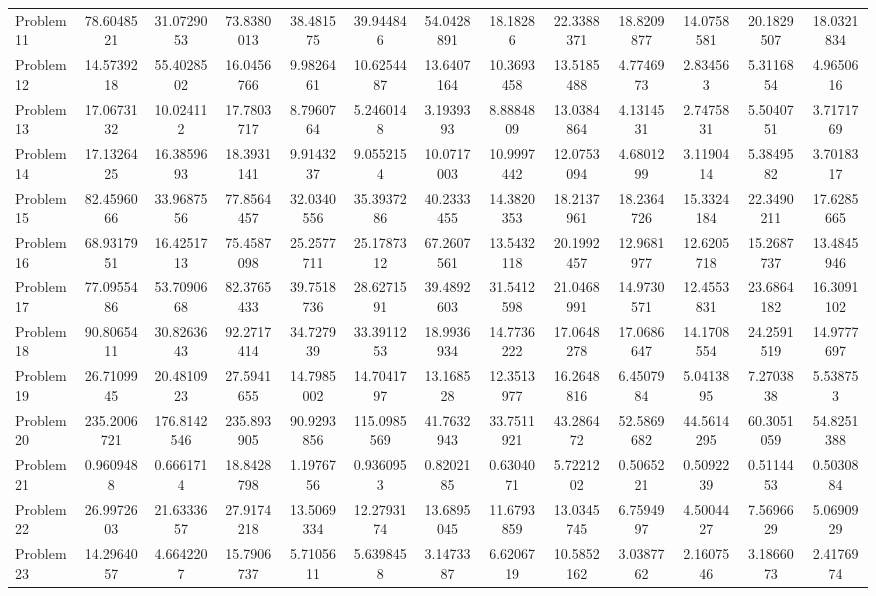 \documentclass[amsmath, amssymb, aps]{revtex4-2}
\begin{document}
\begin{table}[H]
{\begin{tabular}{lcccccccccccc}
Problem 11 & 78.6048521 & 31.0729053 & 73.8380013 & 38.481575 & 39.944846 & 54.0428891 & 18.18286 & 22.3388371 & 18.8209877 & 14.0758581 & 20.1829507 & 18.0321834 \\
Problem 12 & 14.5739218 & 55.4028502 & 16.0456766 & 9.9826461 & 10.6254487 & 13.6407164 & 10.3693458 & 13.5185488 & 4.7746973 & 2.834563 & 5.3116854 & 4.9650616 \\
Problem 13 & 17.0673132 & 10.024112 & 17.7803717 & 8.7960764 & 5.2460148 & 3.1939393 & 8.8884809 & 13.0384864 & 4.1314531 & 2.7475831 & 5.5040751 & 3.7171769 \\
Problem 14 & 17.1326425 & 16.3859693 & 18.3931141 & 9.9143237 & 9.0552154 & 10.0717003 & 10.9997442 & 12.0753094 & 4.6801299 & 3.1190414 & 5.3849582 & 3.7018317 \\
Problem 15 & 82.4596066 & 33.9687556 & 77.8564457 & 32.0340556 & 35.3937286 & 40.2333455 & 14.3820353 & 18.2137961 & 18.2364726 & 15.3324184 & 22.3490211 & 17.6285665 \\
Problem 16 & 68.9317951 & 16.4251713 & 75.4587098 & 25.2577711 & 25.1787312 & 67.2607561 & 13.5432118 & 20.1992457 & 12.9681977 & 12.6205718 & 15.2687737 & 13.4845946 \\
Problem 17 & 77.0955486 & 53.7090668 & 82.3765433 & 39.7518736 & 28.6271591 & 39.4892603 & 31.5412598 & 21.0468991 & 14.9730571 & 12.4553831 & 23.6864182 & 16.3091102 \\
Problem 18 & 90.8065411 & 30.8263643 & 92.2717414 & 34.727939 & 33.3911253 & 18.9936934 & 14.7736222 & 17.0648278 & 17.0686647 & 14.1708554 & 24.2591519 & 14.9777697 \\
Problem 19 & 26.7109945 & 20.4810923 & 27.5941655 & 14.7985002 & 14.7041797 & 13.168528 & 12.3513977 & 16.2648816 & 6.4507984 & 5.0413895 & 7.2703838 & 5.538753 \\
Problem 20 & 235.2006721 & 176.8142546 & 235.893905 & 90.9293856 & 115.0985569 & 41.7632943 & 33.7511921 & 43.286472 & 52.5869682 & 44.5614295 & 60.3051059 & 54.8251388 \\
Problem 21 & 0.9609488 & 0.6661714 & 18.8428798 & 1.1976756 & 0.9360953 & 0.8202185 & 0.6304071 & 5.7221202 & 0.5065221 & 0.5092239 & 0.5114453 & 0.5030884 \\
Problem 22 & 26.9972603 & 21.6333657 & 27.9174218 & 13.5069334 & 12.2793174 & 13.6895045 & 11.6793859 & 13.0345745 & 6.7594997 & 4.5004427 & 7.5696629 & 5.0690929 \\
Problem 23 & 14.2964057 & 4.6642207 & 15.7906737 & 5.7105611 & 5.6398458 & 3.1473387 & 6.6206719 & 10.5852162 & 3.0387762 & 2.1607546 & 3.1866073 & 2.4176974 \\

\end{tabular}}
\end{table}
\end{document}
